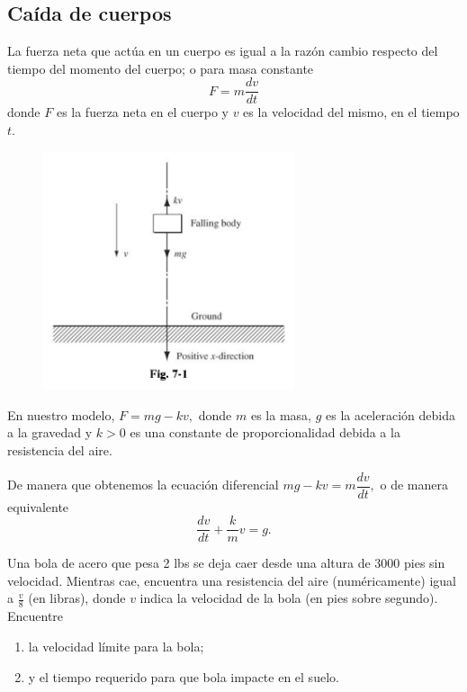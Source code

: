 \subsection{Caída de cuerpos}


	\begin{observacion}
		La fuerza neta que actúa en un cuerpo es igual a la razón cambio respecto del tiempo del momento del cuerpo; o para masa constante
		\[
			\label{bron:7.3}
			F=m\dfrac{dv}{dt}
		\]
		donde $F$ es la fuerza neta en el cuerpo y $v$ es la velocidad del mismo, en el tiempo $t.$
	\end{observacion}





	\begin{figure}
		\centering
		\includegraphics[height=7cm,keepaspectratio=true]{./edo/img020501.png}
		\label{fig:020501}
	\end{figure}




	En nuestro modelo, $F= mg - kv,$ donde $m$ es la masa, $g$ es la aceleración debida a la gravedad y $k>0$ es una constante de proporcionalidad debida a la resistencia del aire.



	De manera que obtenemos la ecuación diferencial $mg-kv=m\dfrac{dv}{dt},$ o de manera equivalente
	\[
		\label{bron:7.4}
		\dfrac{dv}{dt}+\dfrac{k}{m}v=g.
	\]

  \begin{resuelto}
   Una bola de acero que pesa 2 lbs se deja caer desde una altura de 3000 pies sin velocidad. Mientras cae, encuentra una resistencia del aire (numéricamente) igual a $\frac{v}{8}$ (en libras), donde $v$ indica la velocidad de la bola (en pies sobre segundo). Encuentre
   \begin{enumerate}
    \item la velocidad límite para la bola;
    \item y el tiempo requerido para que bola impacte en el suelo.
   \end{enumerate}

  \end{resuelto}




